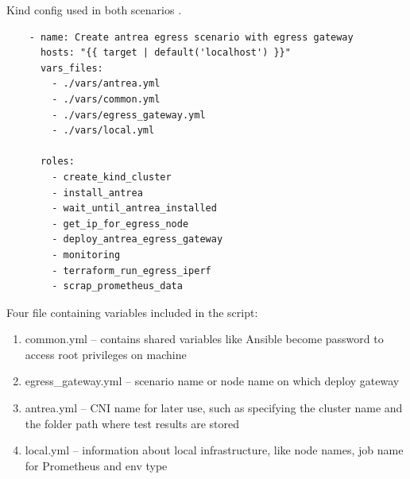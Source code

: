 \begin{listing}[H]
  \centering
  \caption{Kind config used in both scenarios \cite{KindConfig}.}
  \begin{verbatim}
    - name: Create antrea egress scenario with egress gateway
      hosts: "{{ target | default('localhost') }}"
      vars_files:
        - ./vars/antrea.yml
        - ./vars/common.yml
        - ./vars/egress_gateway.yml
        - ./vars/local.yml

      roles:
        - create_kind_cluster
        - install_antrea
        - wait_until_antrea_installed
        - get_ip_for_egress_node
        - deploy_antrea_egress_gateway
        - monitoring
        - terraform_run_egress_iperf
        - scrap_prometheus_data
  \end{verbatim}
  \label{lst:antreaEgressPlaybook}
\end{listing}

Four file containing variables included in the script:
\begin{enumerate}
  \item common.yml -- contains shared variables like Ansible become password to access root privileges on machine
  \item egress\_gateway.yml -- scenario name or node name on which deploy gateway
  \item antrea.yml -- CNI name for later use, such as specifying the cluster name and the folder path where test results are stored
  \item local.yml -- information about local infrastructure, like node names, job name for Prometheus and env type
\end{enumerate}

